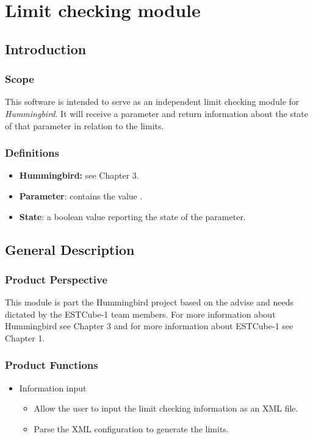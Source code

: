 \section{Limit checking module}

\subsection{Introduction}

\subsubsection{Scope}

This software is intended to serve as an independent limit checking module for \emph{Hummingbird}. It will receive a parameter and return information about the state of that parameter in relation to the limits.

\subsubsection{Definitions}

\begin{itemize}
\item \textbf{Hummingbird:} see Chapter 3.
\item \textbf{Parameter}: contains the value .
\item \textbf{State}: a boolean value reporting the state of the parameter.
\end{itemize}

\subsection{General Description}
\subsubsection{Product Perspective}

This module is part the Hummingbird project based on the advise and needs dictated by the ESTCube-1 team members. For more information about Hummingbird see Chapter 3 and for more information about ESTCube-1 see Chapter 1. 

\subsubsection{Product Functions}

\begin{itemize}
\item Information input
\begin{itemize}
\item Allow the user to input the limit checking information as an XML file.
\item Parse the XML configuration to generate the limits.
\end{itemize}


\end{itemize}

